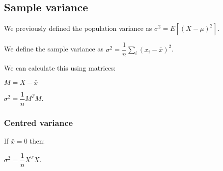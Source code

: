 
\subsection{Sample variance}

We previously defined the population variance as \(\sigma^2=E[(X-\mu)^2]\).

We define the sample variance as \(\sigma^2=\dfrac{1}{n}\sum_i(x_i-\bar x)^2\).

We can calculate this using matrices:

\(M=X-\bar x\)

\(\sigma^2=\dfrac{1}{n}M^TM\).

\subsubsection{Centred variance}

If \(\bar x =0\) then:

\(\sigma^2=\dfrac{1}{n}X^TX\).

